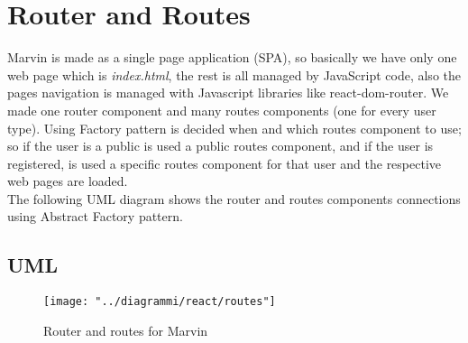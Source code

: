 \documentclass[../react]{subfiles}
\begin{document}
	
	\section{Router and Routes} Marvin is made as a single page application (SPA), so basically we have only one web page which is \textit{index.html}, the rest is all managed by JavaScript code, also the pages navigation is managed with Javascript libraries like react-dom-router. We made one router component and many routes components (one for every user type). Using Factory pattern is decided when and which routes component to use; so if the user is a public is used a public routes component, and if the user is registered, is used a specific routes component for that user and the respective web pages are loaded. \\
	The following UML diagram shows the router and routes components connections using Abstract Factory pattern.
		\subsection{UML}
			\begin{figure}[h]
			\centering
			\texttt{[image: "../diagrammi/react/routes"]}
			\caption{Router and routes for Marvin}
			\label{fig:Router and routes for Marvin}
		\end{figure}
		\newpage
	
\end{document}
